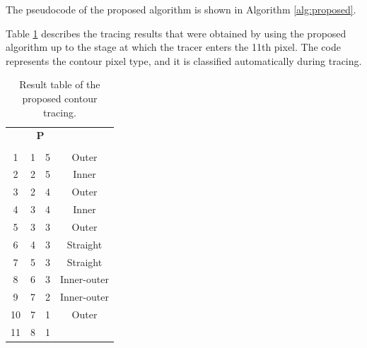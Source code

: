 \documentclass[sensors,article,accept,moreauthors,pdftex,10pt,a4paper]{mdpi}
\begin{document}

The pseudocode of the proposed algorithm is shown in Algorithm \ref{alg:proposed}.




Table \ref{table:table2} describes the tracing results that were obtained by using the proposed algorithm up to the stage at which the tracer enters the 11th pixel. The code represents the contour pixel type, and it is classified automatically during tracing. 

\begin{table}[H]
	\centering
	\begin{tabular}{cccc}
		\toprule
		\multirow{2}{*}{\boldmath{$Sequence(i)$}} & \multicolumn{2}{c}{\textbf{P}} & \multirow{2}{*}{\boldmath{$Code(i)$}} \\
		 \cmidrule(rl){2-3}
		      &\boldmath{$x$}   & \boldmath{$y$} & \\
		\midrule
		1 & 1 & 5 & Outer \\
		2 & 2 & 5 & Inner \\
		3 & 2 & 4 & Outer \\
		4 & 3 & 4 & Inner \\
		5 & 3 & 3 & Outer \\
		6 & 4 & 3 & Straight \\
		7 & 5 & 3 & Straight \\
		8 & 6 & 3 & Inner-outer \\
		9 & 7 & 2 & Inner-outer \\
		10 & 7 & 1 & Outer \\
		11 & 8 & 1 & \\

		\bottomrule
	\end{tabular}
	\caption{Result table of the proposed contour tracing.}
	\label{table:table2}
\end{table}
\end{document}
